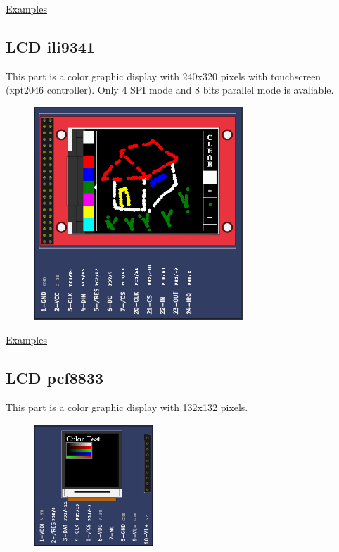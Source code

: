 \href{https://lcgamboa.github.io/picsimlab_examples/Parts.html\#LCD_hd44780}{Examples}

\subsection{LCD ili9341}

This part is a color graphic display with 240x320 pixels with touchscreen (xpt2046 controller).
Only 4 SPI mode and 8 bits parallel mode is avaliable.

\begin{figure}[H]
\center
\includegraphics[width=0.7\textwidth]{img/part_lcd_ili9341.png} 
\end{figure} 

\href{https://lcgamboa.github.io/picsimlab_examples/Parts.html\#LCD_ili9341}{Examples}


\subsection{LCD pcf8833}

This part is a color graphic display with 132x132 pixels.

\begin{figure}[H]
\center
\includegraphics[width=0.4\textwidth]{img/part_pcf8833.png} 
\end{figure} 


